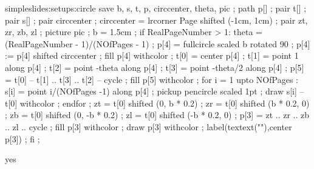 \startsetups simpleslides:setups:circle
save b, s, t, p, circcenter, theta, pic ;
path p[] ;
pair t[] ;
pair s[] ;
pair circcenter ; circcenter = lrcorner Page shifted (-1cm, 1cm) ;
pair zt, zr, zb, zl ;
picture pic ;
b = 1.5cm ;
if RealPageNumber > 1:
	theta = (RealPageNumber - 1)/(NOfPages - 1) ;
 	p[4] = fullcircle scaled b rotated 90 ;
	p[4] := p[4] shifted circcenter ;
 	fill p[4] withcolor  ;
 	t[0] = center p[4] ;
 	t[1] = point 1 along p[4] ;
 	t[2] = point -theta along p[4] ;
 	t[3] = point -theta/2 along p[4] ;
 	p[5] = t[0] -- t[1] .. t[3] .. t[2] -- cycle ;
 	fill p[5] withcolor  ;
 	for i = 1 upto NOfPages :
 		s[i] = point i/(NOfPages -1) along p[4] ;
 		pickup pencircle scaled 1pt ;
 		draw s[i] -- t[0] withcolor  ;
 	endfor ;
 	zt = t[0] shifted (0, b * 0.2) ;
	zr = t[0] shifted (b * 0.2, 0) ;
	zb = t[0] shifted (0, -b * 0.2) ;
	zl = t[0] shifted (-b * 0.2, 0) ;
	p[3] = zt .. zr .. zb .. zl .. cycle ;
 	fill p[3] withcolor   ;
 	draw p[3] withcolor  ;
 	label(textext("\switchtobodyfont[10pt]\pagenumber\stopcolor"),center p[3]) ;
fi ;
\stopuseMPgraphic
\stopsetups

    {}
    {}

\doif%
  {}
  {yes}
  {}


\setuplayout [width=fit,
              margin=0cm,
              height=fit,
              header=3cm,
              footer=0.8cm,
              topspace=.6cm,
              backspace=1cm,
              location=singlesided]




\setupcombinations[distance=1.85cm]

